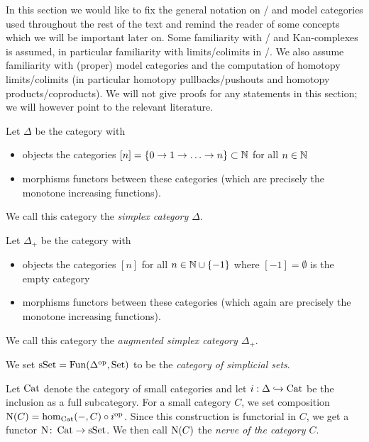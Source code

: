 In this section we would like to fix the general notation on \inftycats/ and model categories used throughout the rest of the text and remind the reader of some concepts which we will be important later on.
Some familiarity with \inftycats/ and Kan-complexes is assumed, in particular familiarity with limits/colimits in \inftycats/.
We also assume familiarity with (proper) model categories and the computation of homotopy limits/colimits (in particular homotopy pullbacks/pushouts and homotopy products/coproducts).
We will not give proofs for any statements in this section; we will however point to the relevant literature.
\begin{definition}
    Let $\Delta$ be the category with
    \begin{itemize}
        \item objects the categories $[n]=\{0\to1\to\ldots\to n\}\subset\mathbb{N}$ for all $n\in\mathbb{N}$
        \item morphisms functors between these categories (which are precisely the monotone increasing functions).
    \end{itemize}
    We call this category the \emph{simplex category $\Delta$}.
\end{definition}
\begin{definition}
    Let $\Delta_+$ be the category with
    \begin{itemize}
        \item objects the categories $[n]$ for all $n\in\mathbb{N}\cup\left\lbrace-1\right\rbrace$ where $[-1]=\emptyset$ is the empty category
        \item morphisms functors between these categories (which again are precisely the monotone increasing functions).
    \end{itemize}
    We call this category the \emph{augmented simplex category $\Delta_+$}.
\end{definition}
\begin{definition}
    We set $\operatorname{sSet}=\operatorname{Fun}(\Delta^{\operatorname{op}},\operatorname{Set})$ to be the \emph{category of simplicial sets}.
\end{definition}
\begin{definition}
    Let $\operatorname{Cat}$ denote the category of small categories and let $i:\Delta\xhookrightarrow{}\operatorname{Cat}$ be the inclusion as a full subcategory.
    For a small category $C$, we set composition $\operatorname{N}(C)=\hom_{\operatorname{Cat}}(-,C)\circ i^{\operatorname{op}}$.
    Since this construction is functorial in $C$, we get a functor $\operatorname{N}\colon\operatorname{Cat}\to\operatorname{sSet}$. 
    We then call $\operatorname{N}(C)$ the \emph{nerve of the category $C$}.
\end{definition}
